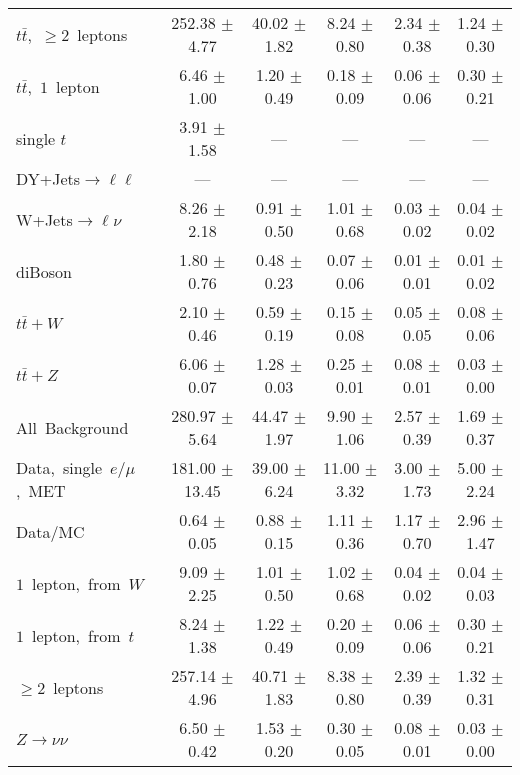 \documentclass{article}
\begin{document}
\begin{longtable}{|l|c|c|c|c|c|}
$t\bar{t}$,~$\ge2$~leptons & 252.38 $\pm$ 4.77  & 40.02 $\pm$ 1.82  & 8.24 $\pm$ 0.80  & 2.34 $\pm$ 0.38  & 1.24 $\pm$ 0.30 \\* 
$t\bar{t}$,~$1$~lepton & 6.46 $\pm$ 1.00  & 1.20 $\pm$ 0.49  & 0.18 $\pm$ 0.09  & 0.06 $\pm$ 0.06  & 0.30 $\pm$ 0.21 \\* 
single $t$  & 3.91 $\pm$ 1.58  & ---  & ---  & ---  & --- \\* 
DY+Jets$\rightarrow\ell\ell$  & ---  & ---  & ---  & ---  & --- \\* 
W+Jets$\rightarrow\ell\nu$  & 8.26 $\pm$ 2.18  & 0.91 $\pm$ 0.50  & 1.01 $\pm$ 0.68  & 0.03 $\pm$ 0.02  & 0.04 $\pm$ 0.02 \\* 
diBoson  & 1.80 $\pm$ 0.76  & 0.48 $\pm$ 0.23  & 0.07 $\pm$ 0.06  & 0.01 $\pm$ 0.01  & 0.01 $\pm$ 0.02 \\* 
$t\bar{t}+W$  & 2.10 $\pm$ 0.46  & 0.59 $\pm$ 0.19  & 0.15 $\pm$ 0.08  & 0.05 $\pm$ 0.05  & 0.08 $\pm$ 0.06 \\* 
$t\bar{t}+Z$  & 6.06 $\pm$ 0.07  & 1.28 $\pm$ 0.03  & 0.25 $\pm$ 0.01  & 0.08 $\pm$ 0.01  & 0.03 $\pm$ 0.00 \\* 
\hline \hline 
All~Background  & 280.97 $\pm$ 5.64  & 44.47 $\pm$ 1.97  & 9.90 $\pm$ 1.06  & 2.57 $\pm$ 0.39  & 1.69 $\pm$ 0.37 \\* 
Data,~single~$e/\mu$,~MET  & 181.00 $\pm$ 13.45  & 39.00 $\pm$ 6.24  & 11.00 $\pm$ 3.32  & 3.00 $\pm$ 1.73  & 5.00 $\pm$ 2.24 \\* 
Data/MC  & 0.64 $\pm$ 0.05  & 0.88 $\pm$ 0.15  & 1.11 $\pm$ 0.36  & 1.17 $\pm$ 0.70  & 2.96 $\pm$ 1.47 \\* 
\hline \hline 
$1$~lepton,~from~$W$  & 9.09 $\pm$ 2.25  & 1.01 $\pm$ 0.50  & 1.02 $\pm$ 0.68  & 0.04 $\pm$ 0.02  & 0.04 $\pm$ 0.03 \\* 
$1$~lepton,~from~$t$  & 8.24 $\pm$ 1.38  & 1.22 $\pm$ 0.49  & 0.20 $\pm$ 0.09  & 0.06 $\pm$ 0.06  & 0.30 $\pm$ 0.21 \\* 
$\ge2$~leptons  & 257.14 $\pm$ 4.96  & 40.71 $\pm$ 1.83  & 8.38 $\pm$ 0.80  & 2.39 $\pm$ 0.39  & 1.32 $\pm$ 0.31 \\* 
$Z\rightarrow\nu\nu$  & 6.50 $\pm$ 0.42  & 1.53 $\pm$ 0.20  & 0.30 $\pm$ 0.05  & 0.08 $\pm$ 0.01  & 0.03 $\pm$ 0.00 \\* 
\hline 
\end{longtable} 

 
 
 
 
\pagebreak 

 
 
\end{document}
